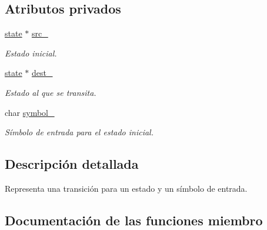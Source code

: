 \subsection*{Atributos privados}
\begin{DoxyCompactItemize}
\item 
\hypertarget{classtransition__t_a7dd43b71a5592511682d1055bacc4e30}{}\hyperlink{classstate}{state} $\ast$ \hyperlink{classtransition__t_a7dd43b71a5592511682d1055bacc4e30}{src\+\_\+}\label{classtransition__t_a7dd43b71a5592511682d1055bacc4e30}

\begin{DoxyCompactList}\small\item\em Estado inicial. \end{DoxyCompactList}\item 
\hypertarget{classtransition__t_aa8b498692df1561ff2ca6a8146438a6b}{}\hyperlink{classstate}{state} $\ast$ \hyperlink{classtransition__t_aa8b498692df1561ff2ca6a8146438a6b}{dest\+\_\+}\label{classtransition__t_aa8b498692df1561ff2ca6a8146438a6b}

\begin{DoxyCompactList}\small\item\em Estado al que se transita. \end{DoxyCompactList}\item 
\hypertarget{classtransition__t_a7b2b2e8bcfbb66df6ac6f8666a59a8e7}{}char \hyperlink{classtransition__t_a7b2b2e8bcfbb66df6ac6f8666a59a8e7}{symbol\+\_\+}\label{classtransition__t_a7b2b2e8bcfbb66df6ac6f8666a59a8e7}

\begin{DoxyCompactList}\small\item\em Símbolo de entrada para el estado inicial. \end{DoxyCompactList}\end{DoxyCompactItemize}


\subsection{Descripción detallada}
Representa una transición para un estado y un símbolo de entrada. 

\subsection{Documentación de las funciones miembro}
\hypertarget{classtransition__t_a91eb01ea36496fd40b84f5f68b598ca6}{}
